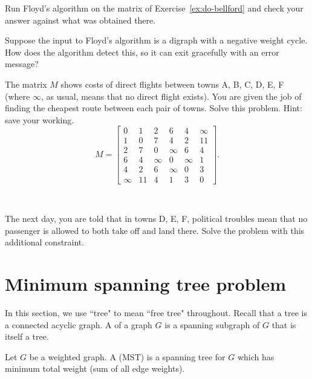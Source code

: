 \begin{Exercise}
\label{do-floyd}
Run Floyd's algorithm on the matrix of Exercise~\ref{ex:do-bellford}
and check your answer against what was obtained there.
\end{Exercise}

\begin{Exercise}
\label{ex:floyd-neg-cycle}
Suppose the input to Floyd's algorithm is a digraph with a negative
weight cycle. How does the algorithm detect this, so it can exit
gracefully with an error message?
\end{Exercise}

\begin{samepage}
\begin{Exercise}
\label{ex:do-floyd-trick}
\item The matrix $M$ shows costs of direct flights between towns A,
B, C, D, E, F (where $\infty$, as usual, means that no direct flight
exists). You are given the job of finding the cheapest route between
each pair of towns. Solve this problem. Hint: save your working.
$$
M = \left[
\begin{matrix}
 0 & 1 & 2 & 6 & 4 & \infty \\
 1 & 0 & 7 & 4 & 2 & 11 \\
2 & 7 & 0 & \infty & 6 & 4\\
 6 & 4 & \infty & 0 & \infty & 1 \\
 4 & 2 & 6 & \infty & 0 & 3 \\
 \infty &11 & 4 & 1 & 3 & 0
\end{matrix}
\right].
$$

\

The next day, you are told that in towns D, E, F, political troubles
mean that no passenger is  allowed to both take off and land there. Solve
the problem with this additional constraint.
\end{Exercise}
\end{samepage}

\chapter{Minimum spanning tree problem}
\label{sec:MST}
In this section, we use ``tree" to mean ``free tree" throughout.
Recall that a tree is a connected acyclic graph. A  of a graph $G$ is a spanning subgraph of $G$ that is itself a tree.

\begin{Definition}
Let $G$ be a weighted graph. A  (MST) 
is a spanning tree for $G$ which has minimum total weight 
(sum of all edge weights). 
\end{Definition}


